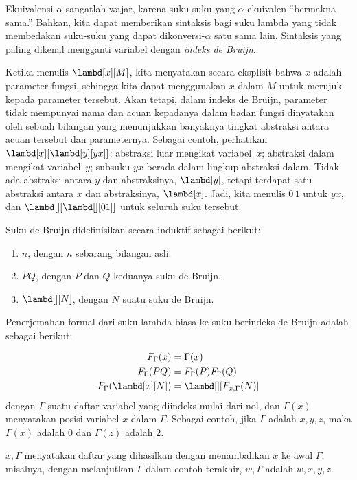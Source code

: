 \documentclass[../../../include/open-logic-section]{subfiles}
\begin{document}


Ekuivalensi-$\alpha$ sangatlah wajar, karena suku-suku yang
$\alpha$-ekuivalen ``bermakna sama.'' Bahkan, kita dapat memberikan sintaksis
bagi suku lambda yang tidak membedakan suku-suku yang dapat
dikonversi-$\alpha$ satu sama lain. Sintaksis yang paling dikenal mengganti
variabel dengan \emph{indeks de Bruijn}.

Ketika menulis $\lambd[x][M]$, kita menyatakan secara eksplisit bahwa $x$
adalah parameter fungsi, sehingga kita dapat menggunakan $x$ dalam $M$ untuk
merujuk kepada parameter tersebut. Akan tetapi, dalam indeks de Bruijn,
parameter tidak mempunyai nama dan acuan kepadanya dalam badan fungsi
dinyatakan oleh sebuah bilangan yang menunjukkan banyaknya tingkat abstraksi
antara acuan tersebut dan parameternya. Sebagai contoh, perhatikan
$\lambd[x][\lambd[y][y x]]$:
abstraksi luar mengikat variabel~$x$; abstraksi dalam mengikat variabel~$y$;
subsuku $y x$ berada dalam lingkup abstraksi dalam. Tidak ada abstraksi antara
$y$ dan abstraksinya, $\lambd[y]$, tetapi terdapat satu abstraksi antara $x$
dan abstraksinya, $\lambd[x]$. Jadi, kita menulis $0\, 1$ untuk $y x$, dan
$\lambd[][\lambd[][01]]$ untuk seluruh suku tersebut.

\begin{defn}
  Suku de Bruijn didefinisikan secara induktif sebagai berikut:
  \begin{enumerate}
  \item $n$, dengan $n$ sebarang bilangan asli.
  \item $PQ$, dengan $P$ dan $Q$ keduanya suku de Bruijn.
  \item $\lambd[][N]$, dengan $N$ suatu suku de Bruijn.
  \end{enumerate}
\end{defn}

Penerjemahan formal dari suku lambda biasa ke suku berindeks de Bruijn adalah
sebagai berikut:
\begin{defn}
  \begin{align*}
    F_\Gamma(x) &= \Gamma(x) \\
    F_\Gamma(PQ) &= F_\Gamma(P)F_\Gamma(Q) \\
    F_\Gamma(\lambd[x][N]) &= \lambd[][F_{x,\Gamma}(N)]
  \end{align*}
  dengan $\Gamma$ suatu daftar variabel yang diindeks mulai dari nol, dan
  $\Gamma(x)$ menyatakan posisi variabel $x$ dalam $\Gamma$. Sebagai contoh,
  jika $\Gamma$ adalah $x,y,z$, maka $\Gamma(x)$ adalah $0$ dan $\Gamma(z)$
  adalah $2$.

  $x,\Gamma$ menyatakan daftar yang dihasilkan dengan menambahkan $x$ ke awal
  $\Gamma$; misalnya, dengan melanjutkan $\Gamma$ dalam contoh terakhir,
  $w,\Gamma$ adalah $w,x,y,z$.
\end{defn}
\end{document}
